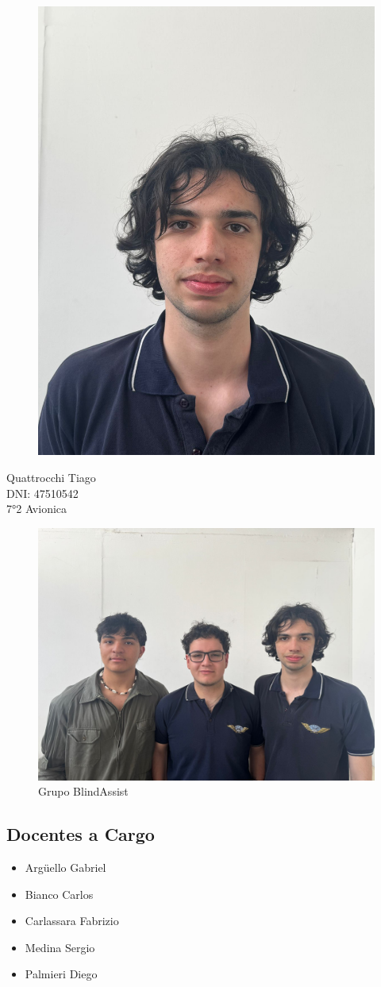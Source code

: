 \documentclass[12pt,a4paper]{article}
\begin{document}
\begin{figure}[H]
    \centering
    \includegraphics[width=0.4\linewidth]{Carpeta tecnica/Fototiago.jpg}
\end{figure}

\begin{center}
Quattrocchi Tiago\\
DNI: 47510542\\
7°2 Avionica
\end{center}

\begin{figure}[H]
    \centering
    \includegraphics[width=0.7\linewidth]{Carpeta tecnica/Fotogrupo.jpg}
    \caption{Grupo BlindAssist}
\end{figure}

\subsection{Docentes a Cargo}
    \begin{center}
        \begin{itemize}
        \item Argüello Gabriel
        \item Bianco Carlos
        \item Carlassara Fabrizio
        \item Medina Sergio
        \item Palmieri Diego
        \end{itemize}
    \end{center}
\end{document}
